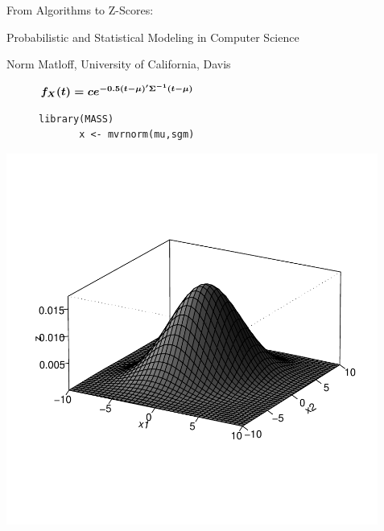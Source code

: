 
\pagecolor{MidnightBlue}
\color{white}

\begin{center}
{\Huge From Algorithms to Z-Scores: 

\bigskip

Probabilistic and Statistical Modeling in Computer Science}

\bigskip

{\LARGE Norm Matloff, University of California, Davis}

\medskip

\end{center}

\vspace{0.1in}

\begin{center}
\begin{figure}[ht]
\color{white}
   \begin{minipage}[b]{0.55\linewidth}
       \Large
       $
       \mbox{\boldmath$ f_X(t) = c e^{-0.5 (t-\mu)'\Sigma^{-1}(t-\mu)}$ } 
       $
   \end{minipage}
   \hspace{0.1in}
   \begin{minipage}[b]{0.58\linewidth}
       {\bf
       \begin{Verbatim}[fontsize=\relsize{+1}]
       library(MASS) 
       x <- mvrnorm(mu,sgm)
       \end{Verbatim}
       }
   \end{minipage}
\end{figure}
\end{center}

\vspace{-1.5in}
\includegraphics[width=4.8in]{Bell.pdf}

